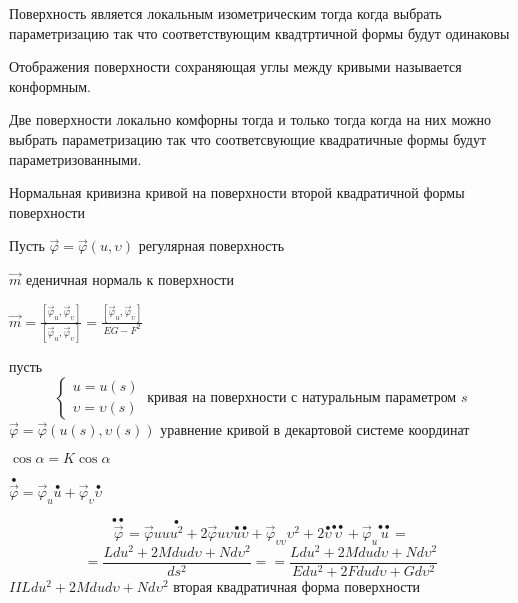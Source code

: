 \begin{theorem}
  Поверхность является локальным изометрическим тогда когда выбрать
  параметризацию так что соответствующим квадтртичной формы будут одинаковы
\end{theorem}

\begin{define}
  Отображения поверхности сохраняющая углы между кривыми называется
  конформным.
\end{define}

\begin{theorem}
  Две поверхности локально комфорны тогда и только тогда когда на них можно
  выбрать параметризацию так что соответсвующие квадратичные формы будут
  параметризованными.
\end{theorem}

\begin{title}[\Large]
  Нормальная кривизна кривой на поверхности второй квадратичной формы
  поверхности
\end{title}

Пусть $\vec \varphi = \vec \varphi(u, \upsilon)$ регулярная поверхность

$\vec m$ еденичная нормаль к поверхности

$\vec m = \frac{[\vec \varphi_u, \vec \varphi_{\upsilon}]}{[\vec \varphi_u,
\vec \varphi_{\upsilon}]} = \frac{[\vec \varphi_u, \vec \varphi_{\upsilon}]}
{EG - F^2}$

пусть
$$
\left\{
\begin{array}{c}
  u = u(s) \\
  \upsilon = \upsilon(s)
\end{array}
\right. ~ \text{кривая на поверхности с натуральным параметром $s$}
$$
$\vec \varphi = \vec \varphi(u(s), \upsilon(s))$ уравнение кривой в декартовой
системе координат

$\cos \alpha = K \cos \alpha$

$\stackrel{\bullet}{\vec \varphi} = \vec \varphi_u \stackrel{\bullet}{u} +
\vec \varphi_{\upsilon} \stackrel{\bullet}{\upsilon}$

$$
\stackrel{\bullet \bullet}{\vec \varphi} = \vec \varphi{uu}
\stackrel{\bullet}{u^2} + 2\vec \varphi{u\upsilon}\stackrel{\bullet}{u}
\stackrel{\bullet}{\upsilon} + \vec \varphi_{\upsilon \upsilon} \upsilon^2
+ 2\stackrel{\bullet}{\upsilon}\stackrel{\bullet \bullet}{\upsilon} +
\vec \varphi_u \stackrel{\bullet \bullet}{u} =
$$
$$
= \frac{Ldu^2 + 2Mdud\upsilon + Nd\upsilon^2}{ds^2} =
= \frac{Ldu^2 + 2Mdud\upsilon + Nd\upsilon^2}{Edu^2 + 2Fdu d\upsilon +
Gd\upsilon^2}
$$
$II Ldu^2 + 2Mdud\upsilon + Nd\upsilon^2$ вторая квадратичная форма поверхности
